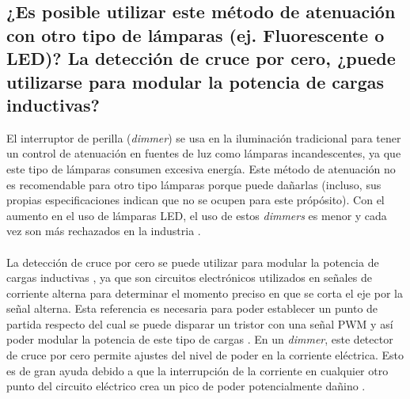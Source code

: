 \documentclass[letterpaper,10.5pt]{article} %
\begin{document}
	\subsection{¿Es posible utilizar este método de atenuación con otro tipo de lámparas (ej. Fluorescente o LED)? La detección de cruce por cero, ¿puede utilizarse para modular la potencia de cargas inductivas?}
	El interruptor de perilla (\emph{dimmer}) se usa en la iluminación tradicional para tener un control de atenuación en fuentes de luz como lámparas incandescentes, ya que este tipo de lámparas consumen excesiva energía. Este método de atenuación no es recomendable para otro tipo lámparas porque puede dañarlas (incluso, sus propias especificaciones indican que no se ocupen para este própósito). Con el aumento en el uso de lámparas LED, el uso de estos \emph{dimmers} es menor y cada vez son más rechazados en la industria \cite{espinel2018modelacion}.\\ \\
	La detección de cruce por cero se puede utilizar para modular la potencia de cargas inductivas \cite{lemus2015diseno}, ya que son circuitos electrónicos utilizados en señales de corriente alterna para determinar el momento preciso en que se corta el eje por la señal alterna. Esta referencia es necesaria para poder establecer un punto de partida respecto del cual se puede disparar un tristor con una señal PWM y así poder modular la potencia de este tipo de cargas \cite{revista}.	En un \emph{dimmer}, este detector de cruce por cero permite ajustes del nivel de poder en la corriente eléctrica. Esto es de gran ayuda debido a que la interrupción de la corriente en cualquier otro punto del circuito eléctrico crea un pico de poder potencialmente dañino \cite{pagina_web}.
	\hfill \break %
	
	
    
\end{document}
